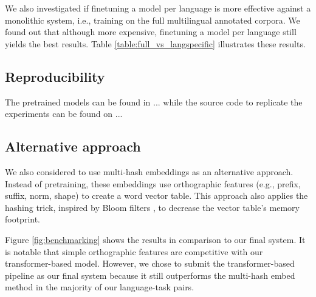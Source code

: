 \documentclass[11pt]{article}
\begin{document}
We also investigated if finetuning a model per language is more effective against a monolithic system, i.e., training on the full multilingual annotated corpora.
We found out that although more expensive, finetuning a model per language still yields the best results. 
Table \ref{table:full_vs_langspecific} illustrates these results.

\subsection{Reproducibility}

The pretrained models can be found in ... while the source code to replicate the experiments can be found on ...

\subsection{Alternative approach}

We also considered to use multi-hash embeddings \cite{miranda-etal-2022-multi} as an alternative approach.
Instead of pretraining, these embeddings use orthographic features (e.g., prefix, suffix, norm, shape) to create a word vector table.
This approach also applies the hashing trick, inspired by Bloom filters \cite{bloom-1970-space}, to decrease the vector table's memory footprint.

Figure \ref{fig:benchmarking} shows the results in comparison to our final system.
It is notable that simple orthographic features are competitive with our transformer-based model.
However, we chose to submit the transformer-based pipeline as our final system because it still outperforms the multi-hash embed method in the majority of our language-task pairs. 
\end{document}
